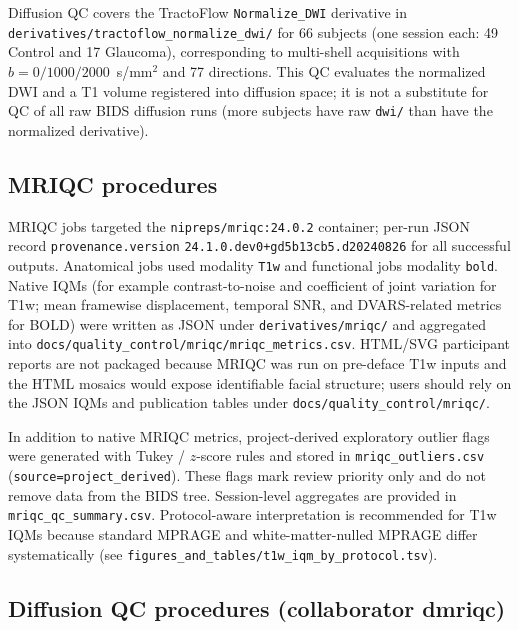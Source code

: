 Diffusion QC covers the TractoFlow \texttt{Normalize\_DWI} derivative in \texttt{derivatives/tractoflow\_normalize\_dwi/} for 66 subjects (one session each: 49 Control and 17 Glaucoma), corresponding to multi-shell acquisitions with $b=0/1000/2000$~s/mm$^2$ and 77 directions. This QC evaluates the normalized DWI and a T1 volume registered into diffusion space; it is not a substitute for QC of all raw BIDS diffusion runs (more subjects have raw \texttt{dwi/} than have the normalized derivative).

\subsection{MRIQC procedures}

MRIQC jobs targeted the \texttt{nipreps/mriqc:24.0.2} container; per-run JSON record \texttt{provenance.version} \texttt{24.1.0.dev0+gd5b13cb5.d20240826} for all successful outputs. Anatomical jobs used modality \texttt{T1w} and functional jobs modality \texttt{bold}. Native IQMs (for example contrast-to-noise and coefficient of joint variation for T1w; mean framewise displacement, temporal SNR, and DVARS-related metrics for BOLD) were written as JSON under \texttt{derivatives/mriqc/} and aggregated into \texttt{docs/quality\_control/mriqc/mriqc\_metrics.csv}. HTML/SVG participant reports are not packaged because MRIQC was run on pre-deface T1w inputs and the HTML mosaics would expose identifiable facial structure; users should rely on the JSON IQMs and publication tables under \texttt{docs/quality\_control/mriqc/}.

In addition to native MRIQC metrics, project-derived exploratory outlier flags were generated with Tukey / $z$-score rules and stored in \texttt{mriqc\_outliers.csv} (\texttt{source=project\_derived}). These flags mark review priority only and do not remove data from the BIDS tree. Session-level aggregates are provided in \texttt{mriqc\_qc\_summary.csv}. Protocol-aware interpretation is recommended for T1w IQMs because standard MPRAGE and white-matter-nulled MPRAGE differ systematically (see \texttt{figures\_and\_tables/t1w\_iqm\_by\_protocol.tsv}).

\subsection{Diffusion QC procedures (collaborator dmriqc)}


